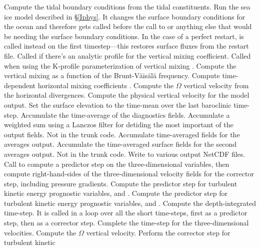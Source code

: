 \begin{klist}
   Compute the tidal boundary conditions from the
    tidal constituents.
   Run the sea ice model described in \S\ref{Iphys}. It
    changes the surface boundary conditions for the ocean and therefore
    gets called before the call to  or anything else that
    would be needing the surface boundary conditions. In the case of a
    perfect restart,  is called instead on the
    first timestep---this restores surface fluxes from the restart file.
   Called if there's an analytic profile for the
    vertical mixing coefficient.
   Called when using the K-profile parameterization
    of vertical mixing \citep{Large94,Large98}.
   Compute the vertical mixing as a function of the
    Brunt-V\"ais\"al\"a frequency.
   Compute time-dependent horizontal mixing coefficients
    \citep{S63, Holland_98, Webb_98,Griffies_2000}.
   Compute the $\Omega$ vertical velocity from the horizontal
    divergences.
   Compute the physical vertical velocity for the
    model output.
   Set the surface elevation to the time-mean over the
    last baroclinic time-step.
   Accumulate the time-average of the diagnostics
    fields.
   Accumulate a weighted sum using a Lanczos filter
  for detiding the most important of the output fields. Not in the trunk
  code.
   Accumulate time-averaged fields for the averages
  output.
   Accumulate the time-averaged surface fields for the
  second averages output. Not in the trunk code.
   Write to various output NetCDF files.
   Call  to compute a predictor
  step on the three-dimensional variables, then compute
  right-hand-sides of the three-dimensional velocity fields for the
  corrector step, including pressure gradients.
   Compute the predictor step for turbulent
  kinetic energy prognostic variables,  and .
   Compute the predictor step for turbulent
  kinetic energy prognostic variables,  and .
   Compute the depth-integrated time-step. It is called in
  a loop over all the short time-steps, first as a predictor step, then
  as a corrector step.
   Complete the time-step for the three-dimensional
  velocities.
   Compute the $\Omega$ vertical velocity.
   Perform the corrector step for turbulent kinetic

\end{klist}
